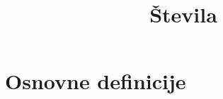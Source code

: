 \documentclass[11pt]{article}
\title{Števila}
\begin{document}
    \maketitle

    \section{Osnovne definicije}
    
\end{document}
